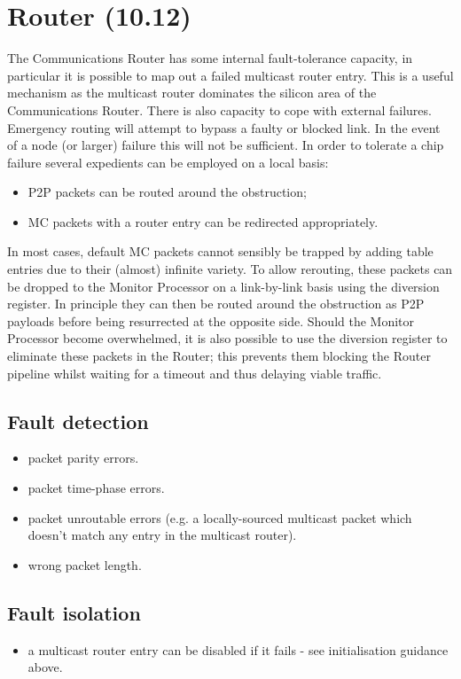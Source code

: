\documentclass[oneside, a4paper, 11pt]{memoir}
\newenvironment{itmz}{
	\begin{itemize}
		\setlength{\itemsep}{0pt}
		\setlength{\parskip}{0pt}
	}{\end{itemize}}
\begin{document}
\section{Router (10.12)}
The Communications Router has some internal fault-tolerance capacity, in particular it is possible to map out a failed multicast router entry. This is a useful mechanism as the multicast router dominates the silicon area of the Communications Router.
There is also capacity to cope with external failures. Emergency routing will attempt to bypass a faulty or blocked link. In the event of a node (or larger) failure this will not be sufficient. In order to tolerate a chip failure several expedients can be employed on a local basis:
\begin{itmz}
\item P2P packets can be routed around the obstruction;
\item MC packets with a router entry can be redirected appropriately.
\end{itmz}
In most cases, default MC packets cannot sensibly be trapped by adding table entries due to their (almost) infinite variety. To allow rerouting, these packets can be dropped to the Monitor Processor on a link-by-link basis using the diversion register. In principle they can then be routed around the obstruction as P2P payloads before being resurrected at the opposite side. Should the Monitor Processor become overwhelmed, it is also possible to use the diversion register to eliminate these packets in the Router; this prevents them blocking the Router pipeline whilst waiting for a timeout and thus delaying viable traffic.

\subsection*{Fault detection}
\begin{itmz}
\item packet parity errors.
\item packet time-phase errors.
\item packet unroutable errors (e.g. a locally-sourced multicast packet which doesn’t match any entry
in the multicast router).
\item wrong packet length.
\end{itmz}
\subsection*{Fault isolation}
\begin{itmz}
\item a multicast router entry can be disabled if it fails - see initialisation guidance above.
\end{itmz}
\end{document}
